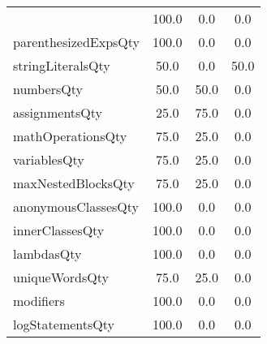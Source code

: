 \begin{tabular}{lccc}
{tryCatchQty & 100.0 & 0.0 & 0.0 \\
parenthesizedExpsQty & 100.0 & 0.0 & 0.0 \\
stringLiteralsQty & 50.0 & 0.0 & 50.0 \\
numbersQty & 50.0 & 50.0 & 0.0 \\
assignmentsQty & 25.0 & 75.0 & 0.0 \\
mathOperationsQty & 75.0 & 25.0 & 0.0 \\
variablesQty & 75.0 & 25.0 & 0.0 \\
maxNestedBlocksQty & 75.0 & 25.0 & 0.0 \\
anonymousClassesQty & 100.0 & 0.0 & 0.0 \\
innerClassesQty & 100.0 & 0.0 & 0.0 \\
lambdasQty & 100.0 & 0.0 & 0.0 \\
uniqueWordsQty & 75.0 & 25.0 & 0.0 \\
modifiers & 100.0 & 0.0 & 0.0 \\
logStatementsQty & 100.0 & 0.0 & 0.0 \\
\bottomrule
              \end{tabular}
            